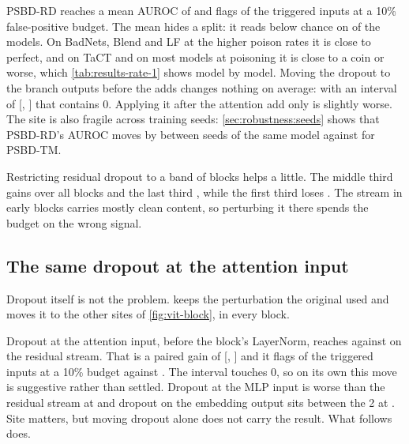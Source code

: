 

PSBD-RD reaches a mean AUROC of \StaircaseResidualPostResidualAuroc{} and flags \StaircaseResidualPostResidualTprAtOneZeroPercent{} of the triggered inputs at a 10\% false-positive budget. The mean hides a split: it reads below chance on \StaircaseResidualPostResidualBelowChance{} of the \StaircaseResidualPostResidualN{} models. On BadNets, Blend and LF at the higher poison rates it is close to perfect, and on TaCT and on most models at \PanelRateLow{} poisoning it is close to a coin or worse, which \cref{tab:results-rate-1} shows model by model. Moving the dropout to the branch outputs before the adds changes nothing on average: \StaircaseResidualPreResidualGain{} with an interval of [\StaircaseResidualPreResidualGainLow{}, \StaircaseResidualPreResidualGainHigh{}] that contains 0. Applying it after the attention add only is slightly worse. The site is also fragile across training seeds: \cref{sec:robustness:seeds} shows that PSBD-RD's AUROC moves by \SeedSdPublished{} between seeds of the same model against \SeedSdRecommended{} for PSBD-TM.

Restricting residual dropout to a band of blocks helps a little. The middle third gains \StaircaseResidualPreResidualBlocksFiveEightGain{} over all blocks and the last third \StaircaseResidualPreResidualBlocksNineOneTwoGain{}, while the first third loses \StaircaseResidualPreResidualBlocksOneFourGain{}. The stream in early blocks carries mostly clean content, so perturbing it there spends the budget on the wrong signal.


\subsection{The same dropout at the attention input}
\label{sec:results:sites}

Dropout itself is not the problem.  keeps the perturbation the original used and moves it to the other sites of \cref{fig:vit-block}, in every block.



Dropout at the attention input, before the block's LayerNorm, reaches \StaircaseDropoutSitesBeforeAttentionNormAuroc{} against \StaircaseDropoutSitesPostResidualAuroc{} on the residual stream. That is a paired gain of \StaircaseDropoutSitesBeforeAttentionNormGain{} [\StaircaseDropoutSitesBeforeAttentionNormGainLow{}, \StaircaseDropoutSitesBeforeAttentionNormGainHigh{}] and it flags \StaircaseDropoutSitesBeforeAttentionNormTprAtOneZeroPercent{} of the triggered inputs at a 10\% budget against \StaircaseDropoutSitesPostResidualTprAtOneZeroPercent{}. The interval touches 0, so on its own this move is suggestive rather than settled. Dropout at the MLP input is worse than the residual stream at \StaircaseDropoutSitesBeforeMlpNormAuroc{} and dropout on the embedding output sits between the 2 at \StaircaseDropoutSitesAfterEmbeddingAuroc{}. Site matters, but moving dropout alone does not carry the result. What follows does.


